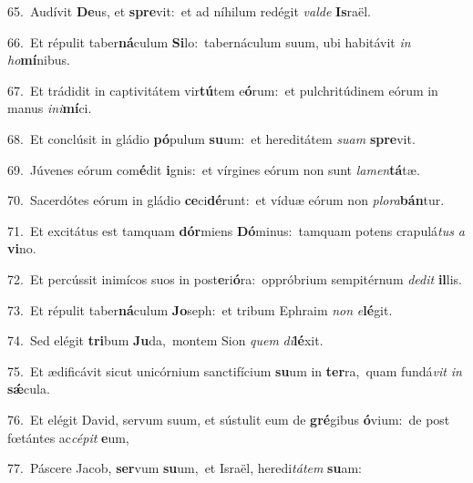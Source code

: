 {\numbfont\textcolor{\numbcolor}{65.}}~Audívit \textbf{De}\-us, et \textbf{spre}\-vit:~\star et ad níhilum redégit \textit{val}\-\textit{de} \textbf{Is}\-raël.\par
{\numbfont\textcolor{\numbcolor}{66.}}~Et répulit taber\-\textbf{ná}\-culum \textbf{Si}\-lo:~\star tabernáculum suum, ubi habitávit \textit{in} \textit{ho}\-\textbf{mí}nibus.\par
{\numbfont\textcolor{\numbcolor}{67.}}~Et trádidit in captivitátem vir\-\textbf{tú}\-tem e\-\textbf{ó}\-rum:~\star et pulchritúdinem eórum in manus \textit{in}\-\textit{i}\textbf{mí}ci.\par
{\numbfont\textcolor{\numbcolor}{68.}}~Et conclúsit in gládio \textbf{pó}\-pulum \textbf{su}\-um:~\star et hereditátem \textit{su}\-\textit{am} \textbf{spre}\-vit.\par
{\numbfont\textcolor{\numbcolor}{69.}}~Júvenes eórum com\-\textbf{é}\-dit \textbf{i}\-gnis:~\star et vírgines eórum non sunt \textit{la}\-\textit{men}\textbf{tá}tæ.\par
{\numbfont\textcolor{\numbcolor}{70.}}~Sacerdótes eórum in gládio \textbf{ce}\-ci\-\textbf{dé}\-runt:~\star et víduæ eórum non \textit{plo}\-\textit{ra}\textbf{bán}tur.\par
{\numbfont\textcolor{\numbcolor}{71.}}~Et excitátus est tamquam \textbf{dór}\-miens \textbf{Dó}\-minus:~\star tamquam potens crapulá\textit{tus} \textit{a} \textbf{vi}\-no.\par
{\numbfont\textcolor{\numbcolor}{72.}}~Et percússit inimícos suos in post\-\textbf{e}\-ri\-\textbf{ó}\-ra:~\star oppróbrium sempitérnum \textit{de}\-\textit{dit} \textbf{il}\-lis.\par
{\numbfont\textcolor{\numbcolor}{73.}}~Et répulit taber\-\textbf{ná}\-culum \textbf{Jo}\-seph:~\star et tribum Ephraim \textit{non} \textit{e}\-\textbf{lé}git.\par
{\numbfont\textcolor{\numbcolor}{74.}}~Sed elégit \textbf{tri}\-bum \textbf{Ju}\-da,~\star montem Sion \textit{quem} \textit{di}\-\textbf{lé}xit.\par
{\numbfont\textcolor{\numbcolor}{75.}}~Et ædificávit sicut unicórnium sanctifícium \textbf{su}\-um in \textbf{ter}\-ra,~\star quam fundá\textit{vit} \textit{in} \textbf{sǽ}\-cula.\par
{\numbfont\textcolor{\numbcolor}{76.}}~Et elégit David, servum suum, et sústulit eum de \textbf{gré}\-gibus \textbf{ó}\-vium:~\star de post fœtántes ac\-\textit{cé}\-\textit{pit} \textbf{e}\-um,\par
{\numbfont\textcolor{\numbcolor}{77.}}~Páscere Jacob, \textbf{ser}\-vum \textbf{su}\-um,~\star et Israël, heredi\-\textit{tá}\-\textit{tem} \textbf{su}\-am:\par
